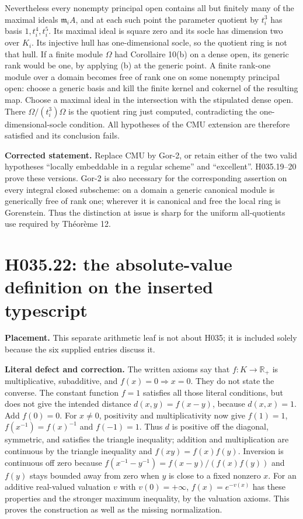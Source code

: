 Nevertheless every nonempty principal open contains all but finitely
many of the maximal ideals $\mathfrak m_iA$, and at each such point
the parameter quotient by $t_i^3$ has basis
$1,t_i^4,t_i^5$. Its maximal ideal is square zero and its socle has
dimension two over $K_i$. Its injective hull has one-dimensional
socle, so the quotient ring is not that hull.
If a finite module $\Omega$ had Corollaire 10(b) on a dense open,
its generic rank would be one, by applying (b) at the generic point.
A finite rank-one module over a domain becomes free of rank one on
some nonempty principal open: choose a generic basis and kill the
finite kernel and cokernel of the resulting map. Choose a maximal
ideal in the intersection with the stipulated dense open. There
$\Omega/(t_i^3)\Omega$ is the quotient ring just computed, contradicting
the one-dimensional-socle condition. All hypotheses of the CMU extension
are therefore satisfied and its conclusion fails.

\textbf{Corrected statement.} Replace CMU by Gor-2, or retain either
of the two valid hypotheses ``locally embeddable in a regular scheme''
and ``excellent''. H035.19--20 prove these versions. Gor-2 is also
necessary for the corresponding assertion on every integral closed
subscheme: on a domain a generic canonical module is generically free
of rank one; wherever it is canonical and free the local ring is
Gorenstein. Thus the distinction at issue is sharp for the uniform
all-quotients use required by Théorème 12.

\section{H035.22: the absolute-value definition on the inserted typescript}
\textbf{Placement.} This separate arithmetic leaf is not about H035;
it is included solely because the six supplied entries discuss it.

\textbf{Literal defect and correction.} The written axioms say that
$f:K\to\mathbb R_+$ is multiplicative, subadditive, and
$f(x)=0\Rightarrow x=0$. They do not state the converse. The constant
function $f=1$ satisfies all those literal conditions, but does not
give the intended distance $d(x,y)=f(x-y)$, because $d(x,x)=1$.
Add $f(0)=0$. For $x\ne0$, positivity and multiplicativity now give
$f(1)=1$, $f(x^{-1})=f(x)^{-1}$ and $f(-1)=1$. Thus $d$ is positive
off the diagonal, symmetric, and satisfies the triangle inequality;
addition and multiplication are continuous by the triangle inequality
and $f(xy)=f(x)f(y)$. Inversion is continuous off zero because
$f(x^{-1}-y^{-1})=f(x-y)/(f(x)f(y))$ and $f(y)$ stays bounded
away from zero when $y$ is close to a fixed nonzero $x$.
For an additive real-valued valuation $v$ with $v(0)=+\infty$,
$f(x)=e^{-v(x)}$ has these properties and the stronger maximum
inequality, by the valuation axioms. This proves the construction as
well as the missing normalization.

